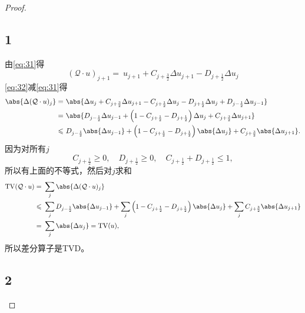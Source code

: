\documentclass[12pt]{article}
\begin{document}
\begin{proof}
~
	\subsection{1}

由\cref{eq:31}得	
	\begin{equation}
		(\mathcal{Q} \cdot u)_{j+1}=\ u_{j+1}+C_{j+\frac{3}{2}} \Delta u_{j+1}-D_{j+\frac{1}{2}} \Delta u_{j}
		\label{eq:32}
	\end{equation}
	\cref{eq:32}减\cref{eq:31}得
	\begin{equation}
		\begin{aligned}
			\abs{\Delta (\mathcal{Q} \cdot u)_{j}}=&\ \abs{\Delta u_{j} + C_{j+\frac{3}{2}} \Delta u_{j+1} - C_{j+\frac{1}{2}} \Delta u_{j}-D_{j+\frac{1}{2}} \Delta u_{j}+D_{j-\frac{1}{2}} \Delta u_{j-1}}\\
			=&\ \abs{D_{j-\frac{1}{2}} \Delta u_{j-1}+\left(1- C_{j+\frac{1}{2}}-D_{j+\frac{1}{2}} \right)\Delta u_{j} + C_{j+\frac{3}{2}} \Delta u_{j+1}}\\
			\leqslant&\ D_{j-\frac{1}{2}} \abs{\Delta u_{j-1}}+\left(1- C_{j+\frac{1}{2}}-D_{j+\frac{1}{2}} \right)\abs{\Delta u_{j}} + C_{j+\frac{3}{2}} \abs{\Delta u_{j+1}}.
		\end{aligned}
	\end{equation}
因为对所有$j$
\begin{equation}
	C_{j+\frac{1}{2}} \geq 0, \quad D_{j+\frac{1}{2}} \geq 0, \quad C_{j+\frac{1}{2}}+D_{j+\frac{1}{2}} \leqslant 1,
\end{equation}
所以有上面的不等式，然后对$j$求和
\begin{equation}
	\begin{aligned}
		\mathrm{TV}(\mathcal{Q}\cdot u)=&\ \sum_j \abs{\Delta (\mathcal{Q} \cdot u)_{j}}\\
		\leqslant&\ \sum_j D_{j-\frac{1}{2}} \abs{\Delta u_{j-1}}+\sum_j \left(1- C_{j+\frac{1}{2}}-D_{j+\frac{1}{2}} \right)\abs{\Delta u_{j}} + \sum_j  C_{j+\frac{3}{2}} \abs{\Delta u_{j+1}}\\
		=&\ \sum_j \abs{\Delta u_{j}}=\mathrm{TV}(u),
	\end{aligned}
\end{equation}
所以差分算子是TVD。


\subsection{2}


\end{proof}
\end{document}
